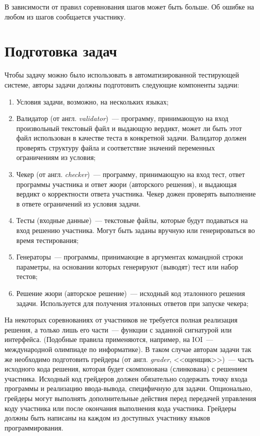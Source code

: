 \documentclass[times,specification,annotation]{style/itmo-student-thesis/itmo-student-thesis}
\begin{document}
В зависимости от правил соревнования шагов может быть больше. Об ошибке на любом из шагов сообщается участнику.

\section{Подготовка задач}

Чтобы задачу можно было использовать в автоматизированной тестирующей системе, авторы задачи должны подготовить следующие компоненты задачи:

\begin{enumerate}
    \item Условия задачи, возможно, на нескольких языках;
    \item Валидатор (от англ. \textit{validator})~--- программу, принимающую на вход произвольный текстовый файл и выдающую вердикт, может ли быть этот файл использован в качестве теста в конкретной задачи. Валидатор должен проверять структуру файла и соответствие значений переменных ограничениям из условия;
    \item Чекер (от англ. \textit{checker})~--- программу, принимающую на вход тест, ответ программы участника и ответ жюри (авторского решения), и выдающая вердикт о корректности ответа участника. Чекер дожен проверять выполнение в ответе ограничений из условия задачи.
    \item Тесты (входные данные)~--- текстовые файлы, которые будут подаваться на вход решению участника. Могут быть заданы вручную или генерироваться во время тестирования;
    \item Генераторы~--- программы, принимаюцие в аргументах командной строки параметры, на основании которых генерируют (выводят) тест или набор тестов;
    \item Решение жюри (авторское решение)~--- исходный код эталонного решения задачи. Используется для получения эталонных ответов при запуске чекера;
\end{enumerate}

На некоторых соревнованиях от участников не требуется полная реализация решения, а только лишь его части~--- функции с заданной сигнатурой или интерфейса. (Подобные правила применяются, например, на IOI~--- международной олимпиаде по информатике). В таком случае авторам задачи так же необходимо подготовить грейдеры (от англ. \textit{grader}, <<оценщик>>)~--- часть исходного кода решения, которая будет скомпонована (слинкована) с решением участника. Исходный код грейдеров должен обязательно содержать точку входа программы и реализацию ввода-вывода, специфичную для задачи. Опционально, грейдеры могут выполнять дополнительные действия перед передачей управления коду участника или после окончания выполнения кода участника. Грейдеры должны быть написаны на каждом из доступных участнику языков программирования.
\end{document}
